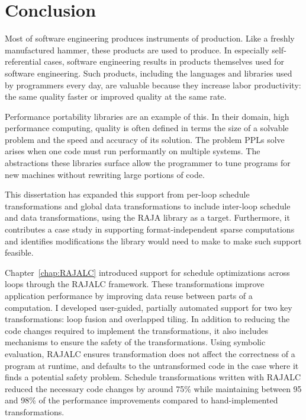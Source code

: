 \chapter{Conclusion}\label{chap:Conclusion}

Most of software engineering produces instruments of production.
Like a freshly manufactured hammer, these products are used to produce.
In especially self-referential cases, software engineering results in products themselves used for software engineering.
Such products, including the languages and libraries used by programmers every day, are valuable because they increase labor productivity: the same quality faster or improved quality at the same rate.

Performance portability libraries are an example of this.
In their domain, high performance computing, quality is often defined in terms the size of a solvable problem and the speed and accuracy of its solution.
The problem PPLs solve arises when one code must run performantly on multiple systems. 
The abstractions these libraries surface allow the programmer to tune programs for new machines without rewriting large portions of code.

This dissertation has expanded this support from per-loop schedule transformations and global data transformations to include inter-loop schedule and data transformations, using the RAJA library as a target.
Furthermore, it contributes a case study in supporting format-independent sparse computations and identifies modifications the library would need to make to make such support feasible.

Chapter~\ref{chap:RAJALC} introduced support for schedule optimizations across loops through the RAJALC framework.
These transformations improve application performance by improving data reuse between parts of a computation.
I developed user-guided, partially automated support for two key transformations: loop fusion and overlapped tiling.
In addition to reducing the code changes required to implement the transformations, it also includes mechanisms to ensure the safety of the transformations.
Using symbolic evaluation, RAJALC ensures transformation does not affect the correctness of a program at runtime, and defaults to the untransformed code in the case where it finds a potential safety problem.
Schedule transformations written with RAJALC reduced the necessary code changes by around 75\% while maintaining between 95 and 98\% of the performance improvements compared to hand-implemented transformations.

